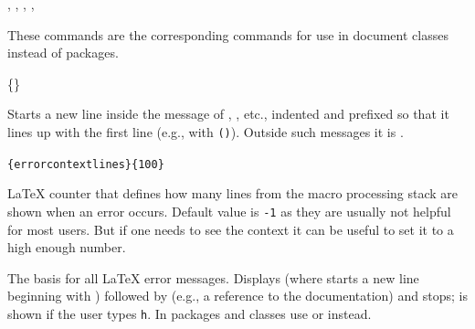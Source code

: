 \documentclass{l3in2edoc}
\begin{document}
\begin{function}[]
  {
    \ClassWarning,
    \ClassWarningNoLine,
    \ClassNote,
    \ClassNoteNoLine,
    \ClassInfo
  }
  \begin{syntax}
  \end{syntax}
  These commands are the corresponding commands
  for use in document classes instead of packages.
\end{function}


\begin{function}[]
  {
    \MessageBreak
  }
  \begin{syntax}
    \{\}
  \end{syntax}
  Starts a new line inside the message of ,
  , etc., indented and prefixed so that it lines up
  with the first line (e.g., with \texttt{()}). Outside
  such messages it is .
\end{function}




\begin{variable}[user]
  {
    \c@errorcontextlines
  }
  \begin{syntax}
    \texttt{\{errorcontextlines\}\{100\}}
  \end{syntax}
  \LaTeX{} counter that defines how many lines from the macro
  processing stack are shown when an error occurs. Default value is
  \texttt{-1} as they are usually not helpful for most users. But if
  one needs to see the context it can be useful to set it to a high
  enough number.
\end{variable}



\begin{function}[]
  {
    \GenericError
  }
  \begin{syntax}
        
  \end{syntax}
  The basis for all \LaTeX{} error messages. Displays 
  (where  starts a new line beginning with
  ) followed by  (e.g., a
  reference to the documentation) and stops;  is shown if
  the user types \texttt{h}. In packages and classes use
   or  instead.
\end{function}
\end{document}
